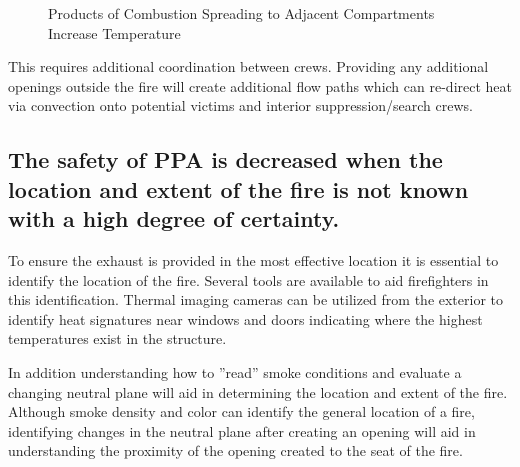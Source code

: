 \documentclass{article}
\begin{document}
\begin{figure} [H]
\begin{tabular}{*2c}
	\end{tabular}
	\caption{Products of Combustion Spreading to Adjacent Compartments Increase Temperature}
	\label{fig:AdditionalVents_TwoStory}
\end{figure}

This requires additional coordination between crews. Providing any additional openings outside the fire will create additional flow paths which can re-direct heat via convection onto potential victims and interior suppression/search crews. 

\subsection{The safety of PPA is decreased when the location and extent of the fire is not known with a high degree of certainty.}
To ensure the exhaust is provided in the most effective location it is essential to identify the location of the fire. Several tools are available to aid firefighters in this identification. Thermal imaging cameras can be utilized from the exterior to identify heat signatures near windows and doors indicating where the highest temperatures exist in the structure. 

In addition understanding how to ''read'' smoke conditions and evaluate a changing neutral plane will aid in determining the location and extent of the fire. Although smoke density and color can identify the general location of a fire, identifying changes in the neutral plane after creating an opening will aid in understanding the proximity of the opening created to the seat of the fire. 
\end{document}
